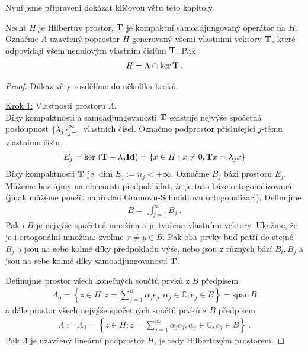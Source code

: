 Nyní jsme připraveni dokázat klíčovou větu této kapitoly.
\begin{theorem} \label{4.Hilbert-Schmidt}
Nechť $H$ je Hilbertův prostor, $\mathbf{T}$ je kompaktní samoadjungovaný operátor na $H$. Označme $\Lambda$ uzavřený poprostor $H$ generovaný všemi vlastními vektory $\mathbf{T}$, které odpovídají všem nenulovým vlastním číslům $\mathbf{T}$. Pak \begin{align*}
    H = \Lambda \oplus \mathrm{ker}\, \mathbf{T} \:.
\end{align*}
\end{theorem}

\begin{proof}
Důkaz věty rozdělíme do několika kroků.

\underline{Krok 1:} Vlastnosti prostoru $\Lambda$. \\
Díky kompaktnosti a samoadjungovanosti $\mathbf{T}$ existuje nejvýše spočetná posloupnost $\left \lbrace \lambda_j \right \rbrace_{j=1}^\infty$ vlastních čísel. Označme podprostor příslušející $j$-tému vlastnímu číslu \begin{align*}
    E_j = \mathrm{ker}\, \left( \mathbf{T} - \lambda_j \mathbf{Id} \right) = \lbrace x \in H : x \neq 0, \mathbf{T} x = \lambda_j x \rbrace
\end{align*}
Díky kompaktnosti $\mathbf{T}$ je $\dim E_j := n_j < + \infty$. Označme $B_j$ bázi prostoru $E_j$. Můžeme bez újmy na obecnosti předpokládat, že je tato báze ortogonalizovaná (jinak můžeme použít například Gramovu-Schmidtovu ortogonalizaci). Definujme \begin{align*}
    B = \bigcup_{j=1}^\infty B_j \:.
\end{align*}
Pak i $B$ je nejvýše spočetná množina a je tvořena vlastními vektory. Ukažme, že je i ortogonální množina: zvolme $x \neq y \in B$. Pak oba prvky buď patří do stejné $B_j$ a jsou na sebe kolmé díky předpokladu výše, nebo jsou z různých bází $B_i, B_j$ a jsou na sebe kolmé díky samoadjungovanosti $\mathbf{T}$.

Definujme prostor všech konečných součtů prvků z $B$ předpisem \begin{align*}
    \Lambda_0 = \left\lbrace z \in H: z = \sum_{j=1}^n \alpha_j e_j, \alpha_j \in \mathbb{C} , e_j \in B \right\rbrace =  \mathrm{span}\, B
\end{align*}
a dále prostor všech nejvýše spočetných součtů prvků z $B$ předpisem \begin{align*}
    \Lambda := \overline{\Lambda_0} = \left\lbrace z \in H: z = \sum_{j=1}^\infty \alpha_j e_j, \alpha_j \in \mathbb{C} , e_j \in B \right\rbrace \:.
\end{align*}
Pak $\Lambda$ je uzavřený lineární podprostor $H$, je tedy Hilbertovým prostorem. 


\end{proof}
